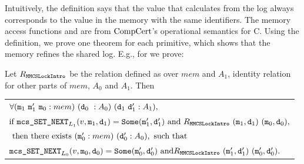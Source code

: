 Intuitively, the definition says that the value that
 calculates from the log always corresponds to the value 
in the memory with the same identifiers. The memory access functions  and  are
from $\mathrm{CompCert}$'s operational semantics for C.
Using the definition, we prove one theorem for each primitive, which
shows that the memory refines the shared log. E.g., for  we prove:

\begin{theorem}
    \label{thm:chapter:mcslock:machine-state-refinement} Let $R_{{\mathrm{\texttt{MMCSLockIntro}}}}$ be the relation defined as 
    over $mem$ and $A_1$, 
identity relation for other parts of $mem$, $A_0$ and $A_1$. Then\newline
 \begin{tabular}{P{0.95\textwidth}}
$ \forall (\codeinmath{{m}}_{1} \ \codeinmath{{m}}_{1}'\ \codeinmath{{m}}_{0} : mem)\  (\codeinmath{{d}}_{0} \ : A_0)\ (\codeinmath{{d}}_{1} \ \codeinmath{{d}}_{1}' : A_1),$ \\
$ \mbox{if } {\mathrm{\texttt{{mcs\_SET\_NEXT}}}}_{L_1}(v, {\mathrm{\texttt{{m}}}}_1, {\mathrm{\texttt{{d}}}}_1) = {\mathrm{\texttt{{Some}}}}({\mathrm{\texttt{{m}}}}'_1, {\mathrm{\texttt{{d}}}}'_1) \mbox{ and }
  R_{{\mathrm{\texttt{MMCSLockIntro}}}}\ ({\mathrm{\texttt{{m}}}}_1, {\mathrm{\texttt{{d}}}}_1)\ ({\mathrm{\texttt{{m}}}}_0, {\mathrm{\texttt{{d}}}}_0),$\\
  $ \mbox{ then there exists } ({\mathrm{\texttt{{m}}}}_{0}' : mem)\ ({\mathrm{\texttt{{d}}}}_{0}' : A_0), \mbox{ such that}$\\
$  {\mathrm{\texttt{{mcs\_SET\_NEXT}}}}_{L_0}(v, {\mathrm{\texttt{{m}}}}_0, {\mathrm{\texttt{{d}}}}_0) = {\mathrm{\texttt{{Some}}}}({\mathrm{\texttt{{m}}}}'_0, {\mathrm{\texttt{{d}}}}'_0) \mbox{ and}
  R_{{\mathrm{\texttt{MMCSLockIntro}}}}\ ({\mathrm{\texttt{{m}}}}'_1, {\mathrm{\texttt{{d}}}}'_1)\ ({\mathrm{\texttt{{m}}}}'_0, {\mathrm{\texttt{{d}}}}'_0).$ 
   \end{tabular}
\end{theorem}


